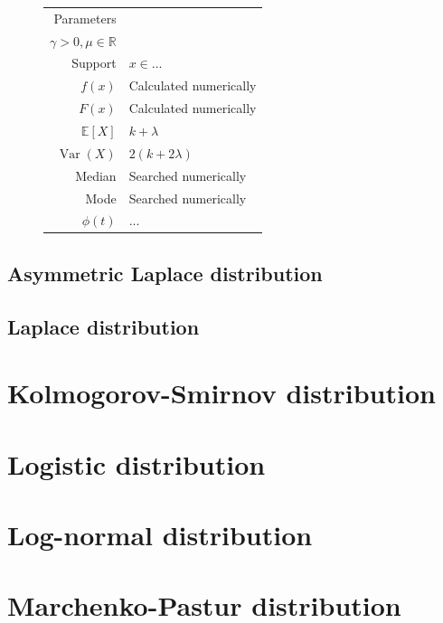 \documentclass[a4paper,11pt]{article}
\theoremstyle{plain}
\theoremstyle{definition}
\newcommand{\ME}{\mathbb{E}}
\newcommand{\MR}{\mathbb{R}}
\newcommand{\Var}{\operatorname{Var}}
\begin{document}
\begin{figure}[!htb]
\begin{minipage}{0.4\textwidth}
\begin{tabular}{| r | l |}
				Parameters & \pbox{\linewidth}{$\alpha \in (0, 2], \beta \in [-1, 1],$\\ $\gamma > 0, \mu \in \MR $} \\
				\hline
				Support & $x \in ...$  \\
				\hline
				$f(x)$ & Calculated numerically \\
				\hline
				$F(x)$ & Calculated numerically \\
				\hline
				$\ME[X]$ & $ k + \lambda$ \\
				\hline
				$\Var(X)$ & $2(k+2\lambda)$ \\
				\hline
				Median & Searched numerically \\
				\hline
				Mode & Searched numerically \\
				\hline
				$\phi(t)$ & $ ...$ \\
				\hline
			\end{tabular}
		\end{minipage}
	\end{figure}
	
	\subsection{Asymmetric Laplace distribution}

	\subsection{Laplace distribution}
	
	\pagebreak
	\section{Kolmogorov-Smirnov distribution}
	\pagebreak
	\section{Logistic distribution}
	\pagebreak
	\section{Log-normal distribution}
	\pagebreak
	\section{Marchenko-Pastur distribution}
	
	\pagebreak
\end{document}
